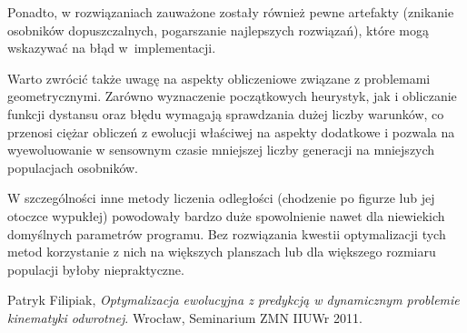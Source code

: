 \documentclass[11pt, leqno]{article}
\begin{document}
Ponadto, w rozwiązaniach zauważone zostały również pewne artefakty (znikanie osobników dopuszczalnych, pogarszanie najlepszych rozwiązań), które mogą wskazywać na błąd w~implementacji.

Warto zwrócić także uwagę na aspekty obliczeniowe związane z problemami geometrycznymi. Zarówno wyznaczenie początkowych heurystyk, jak i obliczanie funkcji dystansu oraz błędu wymagają sprawdzania dużej liczby warunków, co przenosi ciężar obliczeń z ewolucji właściwej na aspekty dodatkowe i pozwala na wyewoluowanie w sensownym czasie mniejszej liczby generacji na mniejszych populacjach osobników. 

W szczególności inne metody liczenia odległości (chodzenie po figurze lub jej otoczce wypukłej) powodowały bardzo duże spowolnienie nawet dla niewiekich domyślnych parametrów programu. Bez rozwiązania kwestii optymalizacji tych metod korzystanie z nich na większych planszach lub dla większego rozmiaru populacji byłoby niepraktyczne.

\begin{thebibliography}{1}
	 Patryk Filipiak, {\it Optymalizacja ewolucyjna z predykcją w dynamicznym problemie kinematyki odwrotnej}. Wrocław, Seminarium ZMN IIUWr 2011.
\end{thebibliography}
\end{document}
